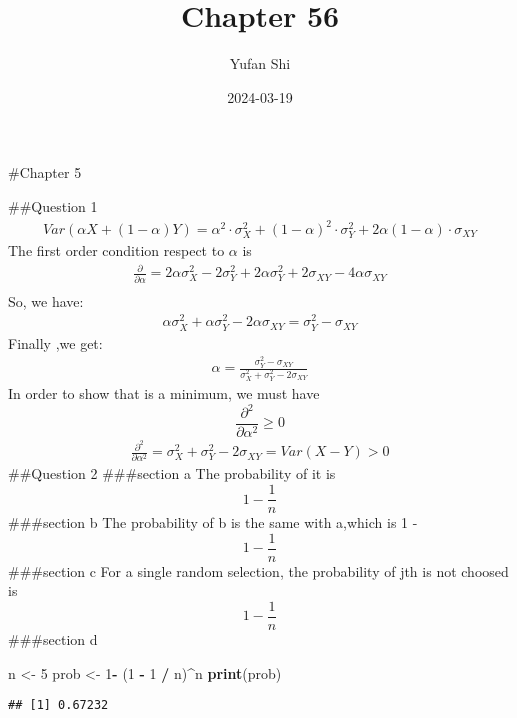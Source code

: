 \documentclass[
]{article}
\title{Chapter 56}
\author{Yufan Shi}
\date{2024-03-19}
\newenvironment{Shaded}{\begin{snugshade}}{\end{snugshade}}
\newcommand{\DecValTok}[1]{\textcolor[rgb]{0.00,0.00,0.81}{#1}}
\newcommand{\FunctionTok}[1]{\textcolor[rgb]{0.13,0.29,0.53}{\textbf{#1}}}
\newcommand{\NormalTok}[1]{#1}
\newcommand{\OtherTok}[1]{\textcolor[rgb]{0.56,0.35,0.01}{#1}}
\newcommand{\SpecialCharTok}[1]{\textcolor[rgb]{0.81,0.36,0.00}{\textbf{#1}}}
\begin{document}
\maketitle

\#Chapter 5

\#\#Question 1 \[
\begin{align*}
    Var(\alpha X + (1 - \alpha)Y) = 
    \alpha^2\cdot\sigma^2_X + (1 - \alpha)^2\cdot \sigma^2_Y + 2\alpha(1 - \alpha) \cdot \sigma_{XY}
\end{align*}
\] The first order condition respect to \(\alpha\) is \[
\begin{align*}
    \frac{\partial}{\partial \alpha} = 2\alpha\sigma^2_X - 2\sigma^2_Y + 2\alpha \sigma^2_Y + 2\sigma_{XY} -4\alpha \sigma_{XY}\\
\end{align*}
\] So, we have: \[
\begin{align*}
    \alpha\sigma^2_X + \alpha\sigma^2_Y - 2\alpha\sigma_{XY} = \sigma^2_Y - \sigma_{XY}
\end{align*}
\] Finally ,we get: \[
\begin{align*}
    \alpha  = \frac{\sigma^2_Y - \sigma_{XY}}{\sigma^2_X + \sigma^2_Y - 2\sigma_{XY}}
\end{align*}
\] In order to show that is a minimum, we must have
\[\frac{\partial^2}{\partial \alpha^2} \geq 0\] \[
\begin{align*}
    \frac{\partial^2}{\partial \alpha^2} = \sigma^2_X + \sigma^2_Y - 2\sigma_{XY} = Var(X-Y) > 0
\end{align*}
\] \#\#Question 2 \#\#\#section a The probability of it is
\[1 - \frac{1}{n}\] \#\#\#section b The probability of b is the same
with a,which is 1 - \[1- \frac{1}{n}\] \#\#\#section c For a single
random selection, the probability of jth is not choosed is
\[1 - \frac{1}{n}\] \#\#\#section d

\begin{Shaded}
\begin{Highlighting}[]
\NormalTok{n }\OtherTok{\textless{}{-}} \DecValTok{5}
\NormalTok{prob }\OtherTok{\textless{}{-}} \DecValTok{1}\SpecialCharTok{{-}}\NormalTok{ (}\DecValTok{1} \SpecialCharTok{{-}} \DecValTok{1} \SpecialCharTok{/}\NormalTok{ n)}\SpecialCharTok{\^{}}\NormalTok{n}
\FunctionTok{print}\NormalTok{(prob)}
\end{Highlighting}
\end{Shaded}

\begin{verbatim}
## [1] 0.67232
\end{verbatim}
\end{document}
